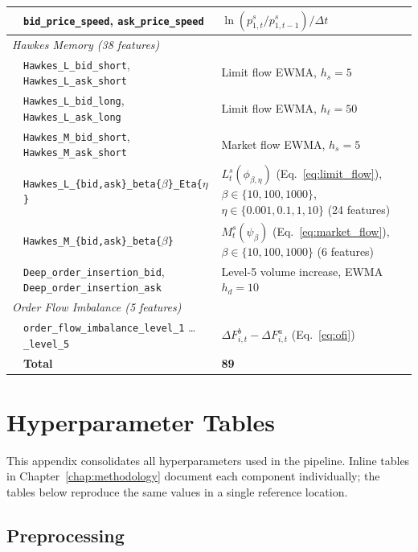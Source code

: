 \documentclass[11pt]{report}
\begin{document}
\begin{table}[H]
\begin{tabular}{p{} p{} p{}}
& \texttt{bid\_price\_speed}, \texttt{ask\_price\_speed} & $\ln(p^s_{1,t}/p^s_{1,t-1})/\Delta t$~\cite{poutre_2024} \\
\midrule
\multicolumn{3}{l}{\textit{Hawkes Memory (38 features)}} \\
\addlinespace
& \texttt{Hawkes\_L\_bid\_short}, \texttt{Hawkes\_L\_ask\_short} & Limit flow EWMA, $h_s{=}5$~\cite{fabre_2025} \\
& \texttt{Hawkes\_L\_bid\_long}, \texttt{Hawkes\_L\_ask\_long} & Limit flow EWMA, $h_\ell{=}50$~\cite{fabre_2025} \\
& \texttt{Hawkes\_M\_bid\_short}, \texttt{Hawkes\_M\_ask\_short} & Market flow EWMA, $h_s{=}5$~\cite{fabre_2025} \\
& \texttt{Hawkes\_L\_\{bid,ask\}\_beta\{$\beta$\}\_Eta\{$\eta$\}} & $L^s_t(\phi_{\beta,\eta})$ (Eq.~\ref{eq:limit_flow}), $\beta \in \{10,100,1000\}$, $\eta \in \{0.001, 0.1, 1, 10\}$ (24 features)~\cite{fabre_2025} \\
& \texttt{Hawkes\_M\_\{bid,ask\}\_beta\{$\beta$\}} & $M^s_t(\psi_\beta)$ (Eq.~\ref{eq:market_flow}), $\beta \in \{10,100,1000\}$ (6 features)~\cite{fabre_2025} \\
& \texttt{Deep\_order\_insertion\_bid}, \texttt{Deep\_order\_insertion\_ask} & Level-5 volume increase, EWMA $h_d{=}10$~\cite{fabre_2025} \\
\midrule
\multicolumn{3}{l}{\textit{Order Flow Imbalance (5 features)}} \\
\addlinespace
& \texttt{order\_flow\_imbalance\_level\_1} \ldots \texttt{\_level\_5} & $\Delta F^b_{i,t} - \Delta F^a_{i,t}$ (Eq.~\ref{eq:ofi}) \\
\midrule
& \textbf{Total} & \textbf{89} \\
\bottomrule
\end{tabular}
\end{table}

\chapter{Hyperparameter Tables}\label{app:hyperparams}

This appendix consolidates all hyperparameters used in the pipeline. Inline tables in Chapter~\ref{chap:methodology} document each component individually; the tables below reproduce the same values in a single reference location.

\section{Preprocessing}\label{app:hyperparams:preprocessing}
\end{document}
